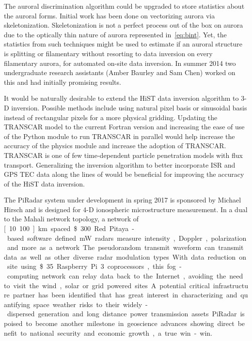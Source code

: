 The auroral discrimination algorithm could be upgraded to store statistics about the auroral forms. 
Initial work has been done on vectorizing aurora via skeletonization.
Skeletonization is not a perfect process out of the box on aurora due to the optically thin nature of aurora represented in~\eqref{eq:bint}.
Yet, the statistics from such techniques might be used to estimate if an auroral structure is splitting or filamentary without resorting to data inversion on every filamentary aurora, for automated on-site data inversion.
In summer 2014 two undergraduate research assistants (Amber Baurley and Sam Chen) worked on this and had initially promising results.

It would be naturally desirable to extend the HiST data inversion algorithm to 3-D inversion.
Possible methods include using natural pixel basis \citep{semeter1998} or sinusoidal basis \citep{bjornthesis} instead of rectangular pixels for a more physical gridding.
Updating the TRANSCAR model to the current Fortran version and increasing the ease of use of the Python module to run TRANSCAR in parallel would help increase the accuracy of the physics module and increase the adoption of TRANSCAR.
TRANSCAR is one of few time-dependent particle penetration models with flux transport.
Generalizing the inversion algorithm to better incorporate ISR and GPS TEC data along the lines of \citet{semeter2016} would be beneficial for improving the accuracy of the HiST data inversion.

The PiRadar system under development in spring 2017 is sponsored by Michael Hirsch and is designed for 4-D ionospheric microstructure measurement.
In a dual to the Mahali network topology, a network of \unit[10..100]{km} spaced \$300 Red Pitaya-based software defined \unit[10]{mW} radars measure intensity, Doppler, polarization and more as a network.
The pseudorandom transmit waveform can transmit data as well as other diverse radar modulation types.
With data reduction on site using \$35 Raspberry Pi 3 coprocessors, this fog-computing network can relay data back to the Internet, avoiding the need to visit the wind, solar or grid powered sites.
A potential critical infrastructure partner has been identified that has great interest in characterizing and quantifying space weather risks to their widely-dispersed generation and long distance power transmission assets.
PiRadar is poised to become another milestone in geoscience advances showing direct benefit to national security and economic growth, a true win-win.
